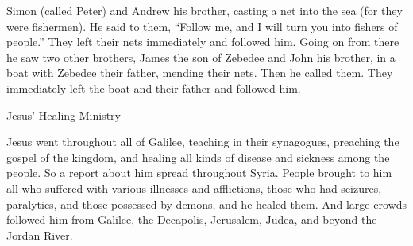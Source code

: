 {Simon
(called
Peter) and
Andrew
his
brother,
casting
a net
into
the sea
(for
they
were fishermen).
He
said
to them,
“Follow
me,
and
I will turn
you
into fishers
of people.”
They left
their nets
immediately
and followed
him.
Going on
from there
he saw
two
other
brothers,
James
the son of Zebedee
and
John
his
brother,
in
a boat
with
Zebedee
their
father,
mending
their
nets.
Then
he called
them.
They immediately
left
the boat
and
their
father
and followed
him.
\par }{\SH Jesus’ Healing Ministry
\par }{\PP {}Jesus went throughout
all
of Galilee,
teaching
in
their
synagogues,
preaching
the gospel
of the kingdom,
and
healing
all
kinds of disease
and
sickness
among
the people.
So
a report
about him
spread
throughout
Syria.
People brought
to him
all
who suffered
with various
illnesses
and
afflictions,
those who had seizures,
paralytics,
and
those possessed by demons,
and
he healed
them.
And
large
crowds
followed
him
from
Galilee,
the Decapolis,
Jerusalem,
Judea,
and
beyond
the Jordan River.

}

